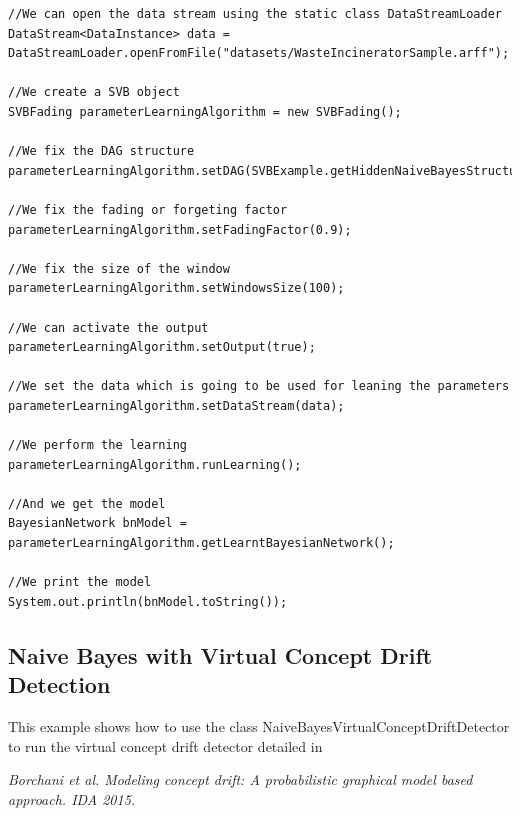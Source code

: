 \begin{lstlisting}
//We can open the data stream using the static class DataStreamLoader
DataStream<DataInstance> data = DataStreamLoader.openFromFile("datasets/WasteIncineratorSample.arff");

//We create a SVB object
SVBFading parameterLearningAlgorithm = new SVBFading();

//We fix the DAG structure
parameterLearningAlgorithm.setDAG(SVBExample.getHiddenNaiveBayesStructure(data));

//We fix the fading or forgeting factor
parameterLearningAlgorithm.setFadingFactor(0.9);

//We fix the size of the window
parameterLearningAlgorithm.setWindowsSize(100);

//We can activate the output
parameterLearningAlgorithm.setOutput(true);

//We set the data which is going to be used for leaning the parameters
parameterLearningAlgorithm.setDataStream(data);

//We perform the learning
parameterLearningAlgorithm.runLearning();

//And we get the model
BayesianNetwork bnModel = parameterLearningAlgorithm.getLearntBayesianNetwork();

//We print the model
System.out.println(bnModel.toString());
\end{lstlisting}


\subsection{Naive Bayes with Virtual Concept Drift Detection}

This example shows how to use the class NaiveBayesVirtualConceptDriftDetector to run the virtual concept drift detector detailed in

\textit{Borchani et al. Modeling concept drift: A probabilistic graphical model based approach. IDA 2015.}

